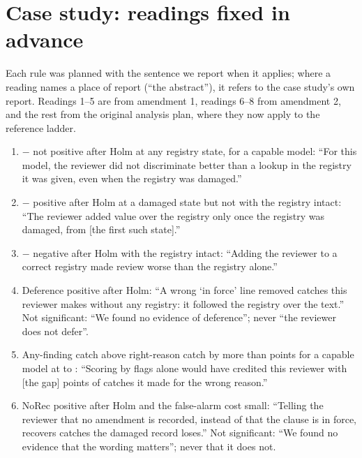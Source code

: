 \section{Case study: readings fixed in advance}
\label{app:interpretations}
Each rule was planned with the sentence we report when it applies; where a reading names a place of report (``the
abstract''), it refers to the case study's own report. Readings 1--5 are from amendment 1, readings
6--8 from amendment 2, and the rest from the original analysis plan, where they now apply to the reference ladder.
\begin{enumerate}
  \item {}$-$ not positive after Holm at any registry state, for a capable model: ``For this
  model, the reviewer did not discriminate better than a lookup in the registry it was given, even when the
  registry was damaged.''
  \item {}$-$ positive after Holm at a damaged state but not with the registry intact: ``The
  reviewer added value over the registry only once the registry was damaged, from [the first such state].''
  \item {}$-$ negative after Holm with the registry intact: ``Adding the reviewer to a correct
  registry made review worse than the registry alone.''
  \item Deference positive after Holm: ``A wrong `in force' line removed catches this reviewer makes without
  any registry: it followed the registry over the text.'' Not significant: ``We found no evidence of
  deference''; never ``the reviewer does not defer''.
  \item Any-finding catch above right-reason catch by more than \InterpPoints{} points for a capable model at
   to : ``Scoring by flags alone would have credited this reviewer with [the gap] points of
  catches it made for the wrong reason.''
  \item NoRec positive after Holm and the false-alarm cost small: ``Telling the reviewer that no amendment is
  recorded, instead of that the clause is in force, recovers catches the damaged record loses.'' Not significant:
  ``We found no evidence that the wording matters''; never that it does not.

\end{enumerate}
